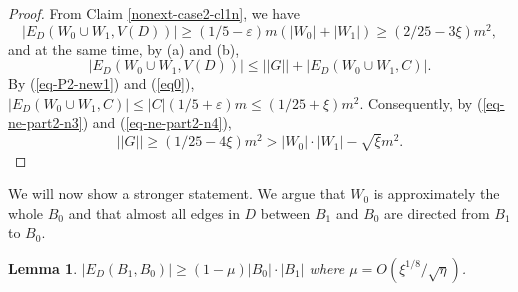 \documentclass{article}
\newtheorem{lemma}[theorem]{Lemma}
\renewcommand{\epsilon}{{\varepsilon}}
\begin{document}
\begin{proof}
From Claim \ref{nonext-case2-cl1n}, we have
\begin{equation}\label{eq-ne-part2-n3}|E_D(W_0\cup W_1, V(D))|\geq (1/5-\epsilon)m (|W_0|+|W_1|)\geq (2/25-3\xi)m^2, \end{equation}
and at the same time, by (a) and (b),
\begin{equation}\label{eq-ne-part2-n4}|E_D(W_0\cup W_1, V(D))|\leq ||G||+|E_D(W_0\cup W_1, C)|.
\end{equation}
By (\ref{eq-P2-new1}) and (\ref{eq0}), $|E_D(W_0\cup W_1, C)|\leq |C|(1/5+\epsilon)m \leq (1/25 +\xi)m^2.$
 Consequently, by (\ref{eq-ne-part2-n3}) and (\ref{eq-ne-part2-n4}),
$$||G||\geq (1/25- 4\xi)m^2> |W_0|\cdot |W_1| -\sqrt{\xi}m^2.$$


\end{proof}
We will now show a stronger statement. We argue that $W_0$ is approximately the whole $B_0$ and that almost all edges in $D$ between $B_1$ and $B_0$ are directed from $B_1$ to $B_0.$
\begin{lemma}\label{non-ext-lem2}
$|E_D(B_1, B_0)|\geq (1-\mu)|B_0|\cdot |B_1|$ where $\mu=O(\xi^{1/8}/\sqrt{\eta})$. 
\end{lemma}
\end{document}
